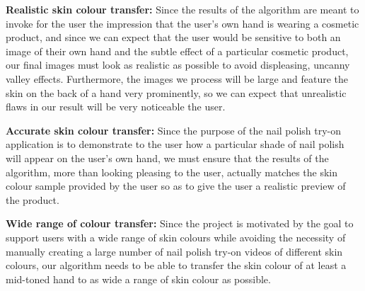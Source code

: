 \textbf{Realistic skin colour transfer:}
Since the results of the algorithm are meant to invoke for the user the impression that the user's own hand is wearing a cosmetic product, and since we can expect that the user would be sensitive to both an image of their own hand and the subtle effect of a particular cosmetic product, our final images must look as realistic as possible to avoid displeasing, uncanny valley effects. Furthermore, the images we process will be large and feature the skin on the back of a hand very prominently, so we can expect that unrealistic flaws in our result will be very noticeable the user.

\textbf{Accurate skin colour transfer:} 
Since the purpose of the nail polish try-on application is to demonstrate to the user how a particular shade of nail polish will appear on the user's own hand, we must ensure that the results of the algorithm, more than looking pleasing to the user, actually matches the skin colour sample provided by the user so as to give the user a realistic preview of the product.

\textbf{Wide range of colour transfer:} Since the project is motivated by the goal to support users with a wide range of skin colours while avoiding the necessity of manually creating a large number of nail polish try-on videos of different skin colours, our algorithm needs to be able to transfer the skin colour of at least a mid-toned hand to as wide a range of skin colour as possible.